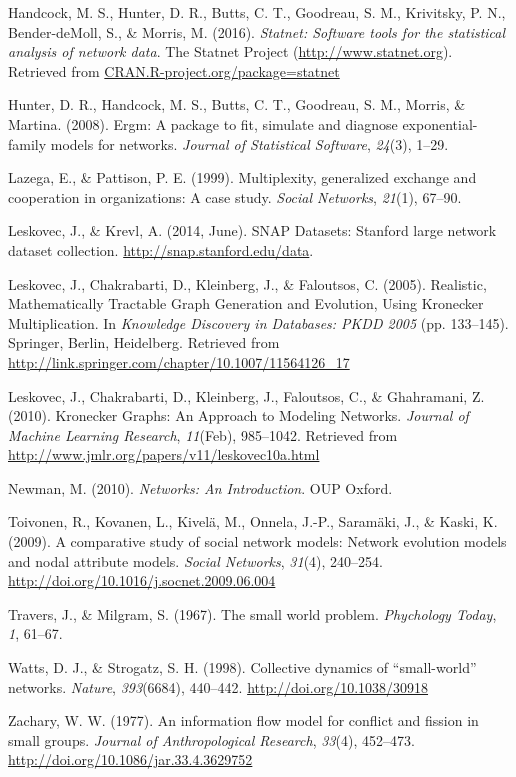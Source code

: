 \documentclass[12pt,twoside]{amherstthesis}
\begin{document}
  \hypertarget{ref-statnetpackagemanual}{}
  Handcock, M. S., Hunter, D. R., Butts, C. T., Goodreau, S. M.,
  Krivitsky, P. N., Bender-deMoll, S., \& Morris, M. (2016).
  \emph{Statnet: Software tools for the statistical analysis of network
  data}. The Statnet Project (\url{http://www.statnet.org}). Retrieved
  from \url{CRAN.R-project.org/package=statnet}
  
  \hypertarget{ref-ergmpackagearticle}{}
  Hunter, D. R., Handcock, M. S., Butts, C. T., Goodreau, S. M., Morris,
  \& Martina. (2008). Ergm: A package to fit, simulate and diagnose
  exponential-family models for networks. \emph{Journal of Statistical
  Software}, \emph{24}(3), 1--29.
  
  \hypertarget{ref-lazega1999multiplexity}{}
  Lazega, E., \& Pattison, P. E. (1999). Multiplexity, generalized
  exchange and cooperation in organizations: A case study. \emph{Social
  Networks}, \emph{21}(1), 67--90.
  
  \hypertarget{ref-snapnets}{}
  Leskovec, J., \& Krevl, A. (2014, June). SNAP Datasets: Stanford large
  network dataset collection. \url{http://snap.stanford.edu/data}.
  
  \hypertarget{ref-leskovec_realistic_2005}{}
  Leskovec, J., Chakrabarti, D., Kleinberg, J., \& Faloutsos, C. (2005).
  Realistic, Mathematically Tractable Graph Generation and Evolution,
  Using Kronecker Multiplication. In \emph{Knowledge Discovery in
  Databases: PKDD 2005} (pp. 133--145). Springer, Berlin, Heidelberg.
  Retrieved from
  \url{http://link.springer.com/chapter/10.1007/11564126_17}
  
  \hypertarget{ref-leskovec_kronecker_2010}{}
  Leskovec, J., Chakrabarti, D., Kleinberg, J., Faloutsos, C., \&
  Ghahramani, Z. (2010). Kronecker Graphs: An Approach to Modeling
  Networks. \emph{Journal of Machine Learning Research}, \emph{11}(Feb),
  985--1042. Retrieved from
  \url{http://www.jmlr.org/papers/v11/leskovec10a.html}
  
  \hypertarget{ref-newman_networks:_2010}{}
  Newman, M. (2010). \emph{Networks: An Introduction}. OUP Oxford.
  
  \hypertarget{ref-toivonen_comparative_2009}{}
  Toivonen, R., Kovanen, L., Kivelä, M., Onnela, J.-P., Saramäki, J., \&
  Kaski, K. (2009). A comparative study of social network models: Network
  evolution models and nodal attribute models. \emph{Social Networks},
  \emph{31}(4), 240--254.
  \url{http://doi.org/10.1016/j.socnet.2009.06.004}
  
  \hypertarget{ref-travers1967small}{}
  Travers, J., \& Milgram, S. (1967). The small world problem.
  \emph{Phychology Today}, \emph{1}, 61--67.
  
  \hypertarget{ref-watts_collective_1998}{}
  Watts, D. J., \& Strogatz, S. H. (1998). Collective dynamics of
  ``small-world'' networks. \emph{Nature}, \emph{393}(6684), 440--442.
  \url{http://doi.org/10.1038/30918}
  
  \hypertarget{ref-zachskarateclub}{}
  Zachary, W. W. (1977). An information flow model for conflict and
  fission in small groups. \emph{Journal of Anthropological Research},
  \emph{33}(4), 452--473. \url{http://doi.org/10.1086/jar.33.4.3629752}


\end{document}
